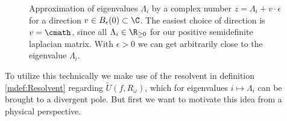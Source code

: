 \begin{figure}[H]
    \centering
    \caption{Approximation of eigenvalues $\Lambda_i$ by a complex number $z = \Lambda_i + v\cdot\epsilon$ for a direction $v\in B_\epsilon(0)\subset\C$. The easiest choice of direction is $v = \cmath$, since all $\Lambda_i\in\R_{\geq 0}$ for our positive semidefinite laplacian matrix. With $\epsilon>0$ we can get arbitrarily close to the eigenvalue $\Lambda_i$.}
    \label{fig:ApproximationOfEigenvalues}
\end{figure}
To utilize this technically we make use of the resolvent in definition \ref{mdef:Resolvent} regarding $\tilde U(f,R_\omega)$, which for eigenvalues $i\mapsto\Lambda_i$ can be brought to a divergent pole.
But first we want to motivate this idea from a physical perspective.

